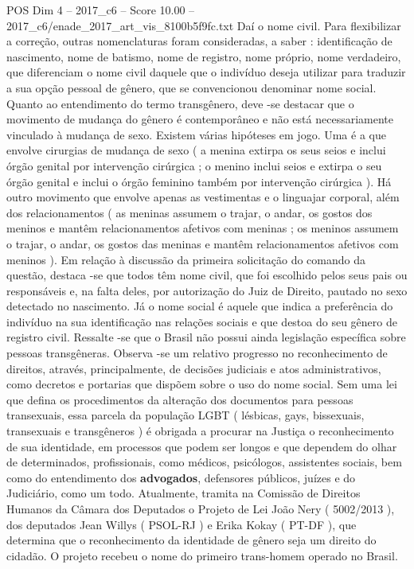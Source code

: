 \begin{textsample}{POS Dim 4 – 2017\_c6 – Score 10.00 – 2017\_c6/enade\_2017\_art\_vis\_8100b5f9fc.txt}
Daí o nome civil.
Para flexibilizar a correção, outras nomenclaturas foram consideradas, a saber : identificação de nascimento, nome de batismo, nome de registro, nome próprio, nome verdadeiro, que diferenciam o nome civil daquele que o indivíduo deseja utilizar para traduzir a sua opção pessoal de gênero, que se convencionou denominar nome social.
Quanto ao entendimento do termo transgênero, deve -se destacar que o movimento de mudança do gênero é contemporâneo e não está necessariamente vinculado à mudança de sexo.
Existem várias hipóteses em jogo.
Uma é a que envolve cirurgias de mudança de sexo ( a menina extirpa os seus seios e inclui órgão genital por intervenção cirúrgica ; o menino inclui seios e extirpa o seu órgão genital e inclui o órgão feminino também por intervenção cirúrgica ).
Há outro movimento que envolve apenas as vestimentas e o linguajar corporal, além dos relacionamentos ( as meninas assumem o trajar, o andar, os gostos dos meninos e mantêm relacionamentos afetivos com meninas ; os meninos assumem o trajar, o andar, os gostos das meninas e mantêm relacionamentos afetivos com meninos ).
Em relação à discussão da primeira solicitação do comando da questão, destaca -se que todos têm nome civil, que foi escolhido pelos seus pais ou responsáveis e, na falta deles, por autorização do Juiz de Direito, pautado no sexo detectado no nascimento.
Já o nome social é aquele que indica a preferência do indivíduo na sua identificação nas relações sociais e que destoa do seu gênero de registro civil.
Ressalte -se que o Brasil não possui ainda legislação específica sobre pessoas transgêneras.
Observa -se um relativo progresso no reconhecimento de direitos, através, principalmente, de decisões judiciais e atos administrativos, como decretos e portarias que dispõem sobre o uso do nome social.
Sem uma lei que defina os procedimentos da alteração dos documentos para pessoas transexuais, essa parcela da população LGBT ( lésbicas, gays, bissexuais, transexuais e transgêneros ) é obrigada a procurar na Justiça o reconhecimento de sua identidade, em processos que podem ser longos e que dependem do olhar de determinados, profissionais, como médicos, psicólogos, assistentes sociais, bem como do entendimento dos \textbf{advogados}, defensores públicos, juízes e do Judiciário, como um todo.
Atualmente, tramita na Comissão de Direitos Humanos da Câmara dos Deputados o Projeto de Lei João Nery ( 5002/2013 ), dos deputados Jean Willys ( PSOL-RJ ) e Erika Kokay ( PT-DF ), que determina que o reconhecimento da identidade de gênero seja um direito do cidadão.
O projeto recebeu o nome do primeiro trans-homem operado no Brasil.

\end{textsample}
